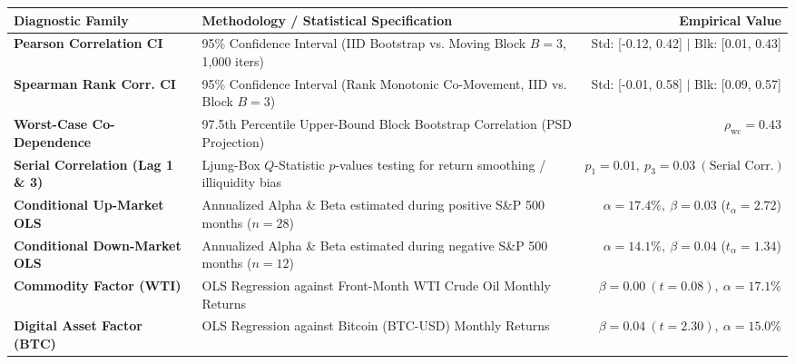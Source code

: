\documentclass[10pt,a4paper]{article}
\begin{document}
\vspace{0.45em}

\begin{tcolorbox}[colback=white, colframe=primary, title=\textbf{\small\strut Appendix A: Extended Statistical, Bootstrap \& Factor Diagnostics}, fonttitle=\sffamily\bfseries\small, arc=5pt, boxrule=0.8pt, toptitle=4pt, bottomtitle=4pt, left=6pt, right=6pt, top=3.5pt, bottom=3.5pt, colbacktitle=primary]
\renewcommand{\arraystretch}{1.22}
\scriptsize
\begin{tabularx}{\textwidth}{l X r}
\toprule
\textbf{\textcolor{primary}{Diagnostic Family}} & \textbf{\textcolor{primary}{Methodology / Statistical Specification}} & \textbf{\textcolor{primary}{Empirical Value}} \\
\midrule
\textbf{Pearson Correlation CI} & 95\% Confidence Interval (IID Bootstrap vs. Moving Block $B=3$, 1,000 iters) & Std: [-0.12, 0.42] $\vert$ Blk: [0.01, 0.43] \\
\rowcolor{cardbg} \textbf{Spearman Rank Corr. CI} & 95\% Confidence Interval (Rank Monotonic Co-Movement, IID vs. Block $B=3$) & Std: [-0.01, 0.58] $\vert$ Blk: [0.09, 0.57] \\
\textbf{Worst-Case Co-Dependence} & 97.5th Percentile Upper-Bound Block Bootstrap Correlation (PSD Projection) & $\rho_{\text{wc}} = 0.43$ \\
\rowcolor{cardbg} \textbf{Serial Correlation (Lag 1 \& 3)} & Ljung-Box $Q$-Statistic $p$-values testing for return smoothing / illiquidity bias & $p_1=0.01,\ p_3=0.03\ (\text{Serial Corr.})$ \\
\textbf{Conditional Up-Market OLS} & Annualized Alpha \& Beta estimated during positive S\&P 500 months ($n=28$) & $\alpha=17.4\%,\ \beta=0.03$ ($t_\alpha=2.72$) \\
\rowcolor{cardbg} \textbf{Conditional Down-Market OLS} & Annualized Alpha \& Beta estimated during negative S\&P 500 months ($n=12$) & $\alpha=14.1\%,\ \beta=0.04$ ($t_\alpha=1.34$) \\
\textbf{Commodity Factor (WTI)} & OLS Regression against Front-Month WTI Crude Oil Monthly Returns & $\beta=0.00\ (t=0.08),\ \alpha=17.1\%$ \\
\rowcolor{cardbg} \textbf{Digital Asset Factor (BTC)} & OLS Regression against Bitcoin (BTC-USD) Monthly Returns & $\beta=0.04\ (t=2.30),\ \alpha=15.0\%$ \\
\bottomrule
\end{tabularx}
\end{tcolorbox}
\end{document}
